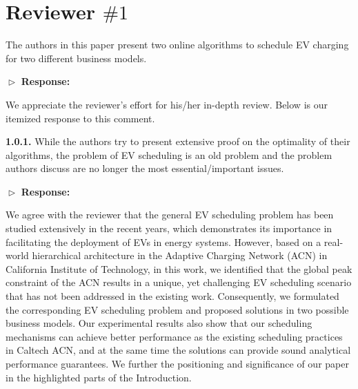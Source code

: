 \documentclass[11pt]{article}
\begin{document}
\newpage
\section{Reviewer $\# 1$}
{\color{blue}}
%

{\color{blue}The authors in this paper present two online algorithms to schedule EV charging for two different business models.}
\vspace{3mm}

$\vartriangleright$ \noindent\textbf{Response:} 

We appreciate the reviewer's effort for his/her in-depth review. Below is our itemized response to this comment. 

\vspace{3mm}
{\color{blue}
\textbf{1.0.1.} While the authors try to present extensive proof on the optimality of their algorithms, the problem of EV scheduling is an old problem and the problem authors discuss are no longer the most essential/important issues. 
 }
\vspace{3mm}

	$\vartriangleright$ \noindent\textbf{Response:} 
	
We agree with the reviewer that the general EV scheduling problem has been studied extensively in the recent years, which demonstrates its importance in facilitating the deployment of EVs in energy systems. However, based on a real-world hierarchical architecture in the Adaptive Charging Network (ACN) in California Institute of Technology, in this work, we identified that the global peak constraint of the ACN results in a unique, yet challenging EV scheduling scenario that has not been addressed in the existing work.  Consequently, we formulated the corresponding EV scheduling problem and proposed solutions in two possible business models. Our experimental results also show that our scheduling mechanisms can achieve better performance as the existing scheduling practices in Caltech ACN, and at the same time the solutions can provide sound analytical performance guarantees. We further the positioning and significance of our paper in the highlighted parts of the Introduction.
	
\end{document}
